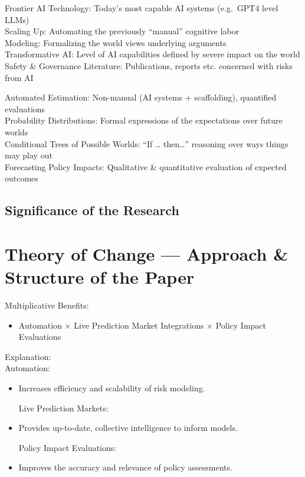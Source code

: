 \documentclass[
  letterpaper,
]{book}
\providecommand{\tightlist}{%
  \setlength{\itemsep}{0pt}\setlength{\parskip}{0pt}}
\begin{document}
Frontier AI Technology: Today's most capable AI systems (e.g.~GPT4 level
LLMs)\\
Scaling Up: Automating the previously ``manual'' cognitive labor\\
Modeling: Formalizing the world views underlying arguments\\
Transformative AI: Level of AI capabilities defined by severe impact on
the world\\
Safety \& Governance Literature: Publications, reports etc. concerned
with risks from AI

Automated Estimation: Non-manual (AI systems + scaffolding), quantified
evaluations\\
Probability Distributions: Formal expressions of the expectations over
future worlds\\
Conditional Trees of Possible Worlds: ``If \ldots{} then\ldots{}''
reasoning over ways things may play out\\
Forecasting Policy Impacts: Qualitative \& quantitative evaluation of
expected outcomes

\subsection{Significance of the
Research}\label{significance-of-the-research}

\section{Theory of Change --- Approach \& Structure of the
Paper}\label{theory-of-change-approach-structure-of-the-paper}

Multiplicative Benefits:

\begin{itemize}
\tightlist
\item
  Automation × Live Prediction Market Integrations × Policy Impact
  Evaluations
\end{itemize}

Explanation:\\
Automation:

\begin{itemize}
\item
  Increases efficiency and scalability of risk modeling.

  Live Prediction Markets:
\item
  Provides up-to-date, collective intelligence to inform models.

  Policy Impact Evaluations:
\item
  Improves the accuracy and relevance of policy assessments.
\end{itemize}
\end{document}
